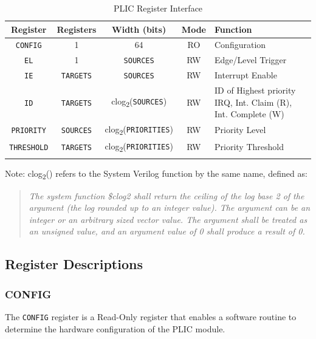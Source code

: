 \begin{longtable}[c]{@{\extracolsep{\fill}}ccccp{5cm}@{\extracolsep{\fill}}}	
	\toprule 
	\textbf{Register} & \textbf{Registers} & \textbf{Width (bits)} & \textbf{Mode} & \textbf{Function} \\
	\midrule 
	\endhead
	\texttt{CONFIG} & 1 & 64 & RO & Configuration\\
	\texttt{EL} & 1 & \texttt{SOURCES} & RW & Edge/Level Trigger\\
	\texttt{IE} & \texttt{TARGETS} & \texttt{SOURCES} & RW & Interrupt Enable\\
	\texttt{ID} & \texttt{TARGETS} & clog\textsubscript{2}(\texttt{SOURCES}) & RW & ID of Highest priority IRQ, \newline Int. Claim (R), \newline Int. Complete (W)\\
	\texttt{PRIORITY} & \texttt{SOURCES} & clog\textsubscript{2}(\texttt{PRIORITIES}) & RW & Priority Level\\
	\texttt{THRESHOLD} & \texttt{TARGETS} & clog\textsubscript{2}(\texttt{PRIORITIES}) & RW & Priority Threshold \\
	\bottomrule 	

\caption{PLIC Register Interface}
\label{tab:REGIF2}
\end{longtable}

Note: clog\textsubscript{2}() refers to the System Verilog function by
the same name, defined as:

\begin{quote}
\emph{The system function \$clog2 shall return the ceiling of the log
base 2 of the argument (the log rounded up to an integer value). The
argument can be an integer or an arbitrary sized vector value. The
argument shall be treated as an unsigned value, and an argument value of
0 shall produce a result of 0.}
\end{quote}

\subsection{Register Descriptions}

\subsubsection{CONFIG}

The \texttt{CONFIG} register is a Read-Only register that enables a
software routine to determine the hardware configuration of the PLIC
module.

